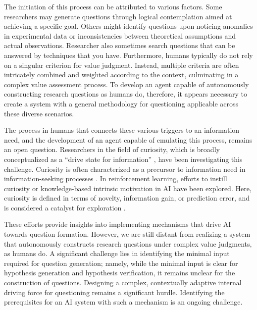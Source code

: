 The initiation of this process can be attributed to various factors. Some researchers may generate questions through logical contemplation aimed at achieving a specific goal. Others might identify questions upon noticing anomalies in experimental data or inconsistencies between theoretical assumptions and actual observations. Researcher also sometimes search questions that can be answered by techniques that you have. Furthermore, humans typically do not rely on a singular criterion for value judgment. Instead, multiple criteria are often intricately combined and weighted according to the context, culminating in a complex value assessment process. To develop an agent capable of autonomously constructing research questions as humans do, therefore, it appears necessary to create a system with a general methodology for questioning applicable across these diverse scenarios.

The process in humans that connects these various triggers to an information need, and the development of an agent capable of emulating this process, remains an open question. Researchers in the field of curiosity, which is broadly conceptualized as a ``drive state for information'' \cite{kidd2015psychology}, have been investigating this challenge. Curiosity is often characterized as a precursor to information need in information-seeking processes \cite{case2016looking}. In reinforcement learning, efforts to instill curiosity or knowledge-based intrinsic motivation in AI have been explored. Here, curiosity is defined in terms of novelty, information gain, or prediction error, and is considered a catalyst for exploration \cite{aubret2019survey}.

These efforts provide insights into implementing mechanisms that drive AI towards question formation. However, we are still distant from realizing a system that autonomously constructs research questions under complex value judgments, as humans do. A significant challenge lies in identifying the minimal input required for question generation; namely, while the minimal input is clear for hypothesis generation and hypothesis verification, it remains unclear for the construction of questions. Designing a complex, contextually adaptive internal driving force for questioning remains a significant hurdle. Identifying the prerequisites for an AI system with such a mechanism is an ongoing challenge.




